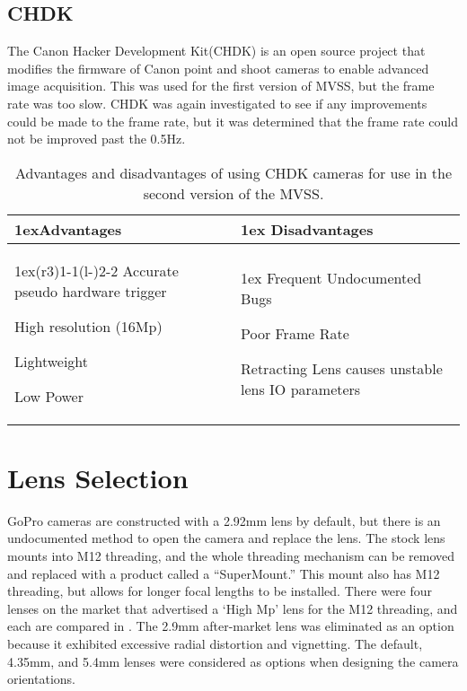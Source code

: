 	\subsection{CHDK}
	The Canon Hacker Development Kit(CHDK) is an open source project that modifies the firmware of Canon point and shoot cameras to enable advanced image acquisition.  This was used for the first version of MVSS, but the frame rate was too slow.  CHDK was again investigated to see if any improvements could be made to the frame rate, but it was determined that the frame rate could not be improved past the 0.5Hz.
	
	\begin{table}[H]
		\begin{tabularx}{\linewidth}{>{\parskip1ex}X@{\kern4\tabcolsep}>{\parskip1ex}X}
			\toprule
			\hfil\bfseries Advantages
			&
			\hfil\bfseries Disadvantages
			\\\cmidrule(r{3\tabcolsep}){1-1}\cmidrule(l{-\tabcolsep}){2-2}
			Accurate pseudo hardware trigger\par
			High resolution (16Mp)\par
			Lightweight\par
			Low Power\par
			&
			Frequent Undocumented Bugs\par
			Poor Frame Rate\par 
			Retracting Lens causes unstable lens IO parameters
			\\\bottomrule
		\end{tabularx}
		\caption{Advantages and disadvantages of using CHDK cameras for use in the second version of the MVSS.}
		\label{tab:chdk}
	\end{table}
	
	\section{Lens Selection}
	GoPro cameras are constructed with a 2.92mm lens by default, but there is an undocumented method to open the camera and replace the lens. The stock lens mounts into M12 threading, and the whole threading mechanism can be removed and replaced with a product called a ``SuperMount.''  This mount also has M12 threading, but allows for longer focal lengths to be installed.  There were four lenses on the market that advertised a `High Mp' lens for the M12 threading, and each are compared in .  The 2.9mm after-market lens was eliminated as an option because it exhibited excessive radial distortion and vignetting.  The default, 4.35mm, and 5.4mm lenses were considered as options when designing the camera orientations.   
	
